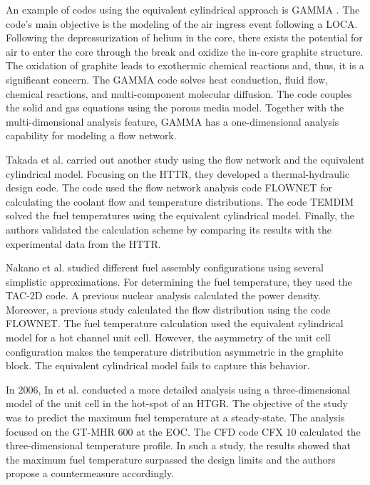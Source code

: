 An example of codes using the equivalent cylindrical approach is GAMMA \cite{no_multi-component_2007}.
The code’s main objective is the modeling of the air ingress event following a LOCA.
Following the depressurization of helium in the core, there exists the potential for air to enter the core through the break and oxidize the in-core graphite structure.
The oxidation of graphite leads to exothermic chemical reactions and, thus, it is a significant concern.
The GAMMA code solves heat conduction, fluid flow, chemical reactions, and multi-component molecular diffusion.
The code couples the solid and gas equations using the porous media model.
Together with the multi-dimensional analysis feature, GAMMA has a one-dimensional analysis capability for  modeling a flow network.

Takada et al. \cite{takada_core_2004} carried out another study using the flow network and the equivalent cylindrical model.
Focusing on the \gls{HTTR}, they developed a thermal-hydraulic design code.
The code used the flow network analysis code FLOWNET \cite{maruyama_verification_1988} for calculating the coolant flow and temperature distributions.
The code TEMDIM \cite{maruyama_verification_1988} solved the fuel temperatures using the equivalent cylindrical model.
Finally, the authors validated the calculation scheme by comparing its results with the experimental data from the \gls{HTTR}.

Nakano et al. \cite{nakano_conceptual_2008} studied different fuel assembly configurations using several simplistic approximations.
For determining the fuel temperature, they used the TAC-2D code.
A previous nuclear analysis calculated the power density.
Moreover, a previous study calculated the flow distribution using the code FLOWNET.
The fuel temperature calculation used the equivalent cylindrical model for a hot channel unit cell.
However, the asymmetry of the unit cell configuration makes the temperature distribution asymmetric in the graphite block.
The equivalent cylindrical model fails to capture this behavior.

In 2006, In et al. \cite{in_three-dimensional_2006} conducted a more detailed analysis using a three-dimensional model of the unit cell in the hot-spot of an \gls{HTGR}.
The objective of the study was to predict the maximum fuel temperature at a steady-state.
The analysis focused on the GT-MHR 600 at the \gls{EOC}.
The CFD code CFX 10 \cite{ansys_inc_cfx_2006} calculated the three-dimensional temperature profile.
In such a study, the results showed that the maximum fuel temperature surpassed the design limits and the authors propose a countermeasure accordingly.

